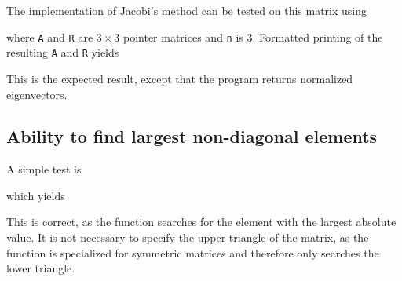 \documentclass[12pt,english,a4paper]{report}
\begin{document}
The implementation of Jacobi's method can be tested on this matrix using

where \texttt{A} and \texttt{R} are \(3\times3\) pointer matrices and \texttt{n} is \(3\). Formatted printing of the resulting \texttt{A} and \texttt{R} yields

This is the expected result, except that the program returns normalized eigenvectors.

\subsection{Ability to find largest non-diagonal elements}
A simple test is

which yields

This is correct, as the function searches for the element with the largest absolute value. It is not necessary to specify the upper triangle of the matrix, as the function is specialized for symmetric matrices and therefore only searches the lower triangle.








\clearpage
{}
\printbibliography
\end{document}
